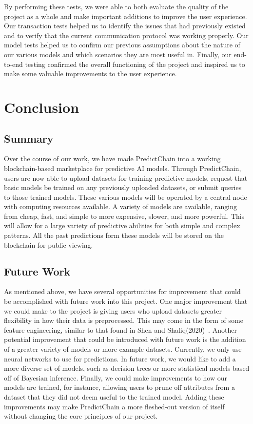 \documentclass{ledger}
\begin{document}
By performing these tests, we were able to both evaluate the quality of the project as a whole and make important
additions to improve the user experience.  Our transaction tests helped us to identify the issues that had
previously existed and to verify that the current communication protocol was working properly.  Our model tests
helped us to confirm our previous assumptions about the nature of our various models and which scenarios they are
most useful in.  Finally, our end-to-end testing confirmed the overall functioning of the project and inspired us
to make some valuable improvements to the user experience.

\section{Conclusion}

\subsection{Summary}

Over the course of our work, we have made PredictChain into a working blockchain-based marketplace for predictive AI models.
Through PredictChain, users are now able to upload datasets for training predictive models, request that basic models
be trained on any previously uploaded datasets, or submit queries to those trained models.
These various models will be operated by a central node with computing resources available. A variety of
models are available, ranging from cheap, fast, and simple to more expensive, slower, and more powerful.
This will allow for a large variety of predictive abilities for both simple and complex patterns.  All the past predictions
form these models will be stored on the blockchain for public viewing.

\subsection{Future Work}

As mentioned above, we have several opportunities for improvement that could be accomplished with future work
into this project.  One major improvement that we could make to the project is giving users who upload datasets greater
flexibility in how their data is preprocessed.  This may come in the form of some feature engineering, similar to
that found in Shen and Shafiq(2020)~\cite{deepPrediction}.  Another potential improvement that could be introduced with future work is
the addition of a greater variety of models or more example datasets.  Currently, we only use neural networks to
use for predictions.  In future work, we would like to add a more diverse set of models, such as decision trees or
more statistical models based off of Bayesian inference.  Finally, we could make improvements to how our models are
trained, for instance, allowing users to prune off attributes from a dataset that they did not deem useful to the
trained model.  Adding these improvements may make PredictChain a more fleshed-out version of itself without changing
the core principles of our project.
\end{document}
